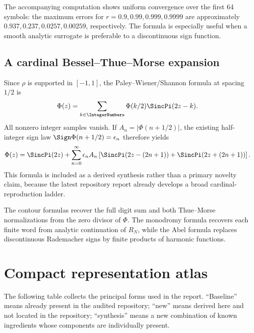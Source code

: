 \documentclass[11pt]{article}
\theoremstyle{definition}
\theoremstyle{remark}
\begin{document}
The accompanying computation shows uniform convergence over the first 64 symbols: the
maximum errors for \(r=0.9,0.99,0.999,0.9999\) are approximately
\(0.937,0.237,0.0257,0.00259\), respectively. The formula is especially useful when a smooth
analytic surrogate is preferable to a discontinuous sign function.

\subsection{A cardinal Bessel--Thue--Morse expansion}

Since \(\rho\) is supported in \([-1,1]\), the Paley--Wiener/Shannon formula at spacing
\(1/2\) is
\begin{equation}
 \Phi(z)=\sum_{k\in\IntegerNumbers}\Phi(k/2)\SincPi(2z-k).
 \label{p7:eq:Shannon-Phi}
\end{equation}
All nonzero integer samples vanish. If
\(A_n=|\Phi(n+1/2)|\), the existing half-integer sign law
\(\Sign\Phi(n+1/2)=\epsilon_n\) therefore yields
\begin{equation}
 \Phi(z)=\SincPi(2z)+\sum_{n=0}^{\infty}\epsilon_nA_n
 \left[\SincPi(2z-(2n+1))+\SincPi(2z+(2n+1))\right].
 \label{p7:eq:Shannon-TM}
\end{equation}
This formula is included as a derived synthesis rather than a primary novelty claim, because
the latest repository report already develops a broad cardinal-reproduction ladder.

\begin{novelbox}
The contour formulas recover the full digit sum and both Thue--Morse normalizations from the
zero divisor of \(\Phi\). The monodromy formula recovers each finite word from analytic
continuation of \(R_N\), while the Abel formula replaces discontinuous Rademacher signs by
finite products of harmonic functions.
\end{novelbox}

\section{Compact representation atlas}
\label{p7:sec:atlas}

The following table collects the principal forms used in the report. ``Baseline'' means
already present in the audited repository; ``new'' means derived here and not located in the
repository; ``synthesis'' means a new combination of known ingredients whose components are
individually present.
\end{document}
